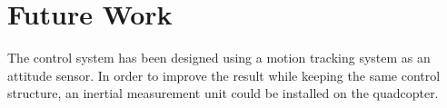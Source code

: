\section{Future Work}\label{sec:futurework}
The control system has been designed using a motion tracking system as an attitude sensor. In order to improve the result while keeping the same control structure, an inertial measurement unit could be installed on the quadcopter.  